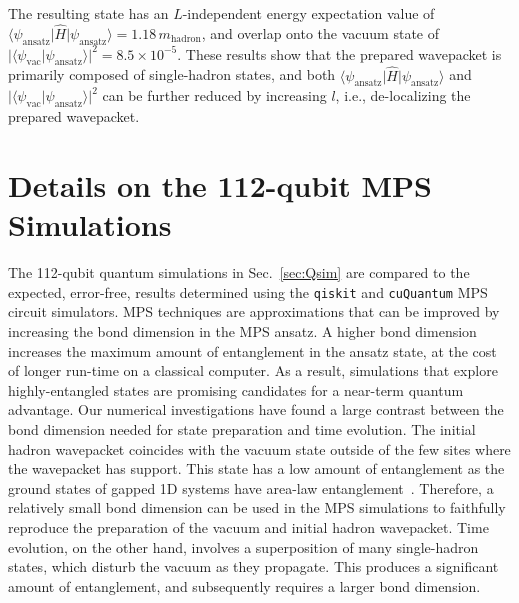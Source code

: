 \documentclass[aps, prc, tightenlines,superscriptaddress, letterpaper, amsmath, amssymb, preprintnumbers, floatfix, longbibliography, nofootinbib]{revtex4-2}
\begin{document}
%
The resulting state has an $L$-independent energy expectation value of $\langle \psi_{\text{ansatz}} \vert \hat{H} \vert \psi_{\text{ansatz}} \rangle = 1.18 \, m_{\text{hadron}}$, and overlap onto the vacuum state of $\vert\langle \psi_{\text{vac}} \vert \psi_{\text{ansatz}} \rangle \vert^2 = 8.5\times 10^{-5}$.
These results show that the prepared wavepacket is primarily composed of single-hadron states, and both $\langle \psi_{\text{ansatz}} \vert \hat{H} \vert \psi_{\text{ansatz}} \rangle$ and $\vert\langle \psi_{\text{vac}} \vert \psi_{\text{ansatz}} \rangle \vert^2$ can be further reduced by increasing $l$, i.e., de-localizing the prepared wavepacket.




\FloatBarrier
\section{Details on the 112-qubit MPS Simulations}
\label{app:MPSSim}
\noindent
The 112-qubit quantum simulations in Sec.~\ref{sec:Qsim} are compared to the expected, error-free, results determined using the {\tt qiskit} and {\tt cuQuantum} MPS circuit simulators.
MPS techniques are approximations that can be improved by increasing the bond dimension in the MPS ansatz. 
A higher bond dimension increases the maximum amount of entanglement in the ansatz state, at the cost of longer run-time on a classical computer.
As a result, simulations that explore highly-entangled states are promising candidates for a near-term quantum advantage.
Our numerical investigations have found a large contrast between the bond dimension needed for state preparation and time evolution.
The initial hadron wavepacket coincides with the vacuum state outside of the few sites where the wavepacket has support.
This state has a low amount of entanglement as the ground states of gapped 1D systems have area-law entanglement~\cite{Hastings_2007,arad2013area,Brand_o_2014}. 
Therefore, a relatively small bond dimension can be used in the MPS simulations to faithfully reproduce the preparation of the vacuum and initial hadron wavepacket.
Time evolution, on the other hand, involves a superposition of many single-hadron states, which disturb the vacuum as they propagate.
This produces a significant amount of entanglement, and subsequently requires a larger bond dimension.
\end{document}
